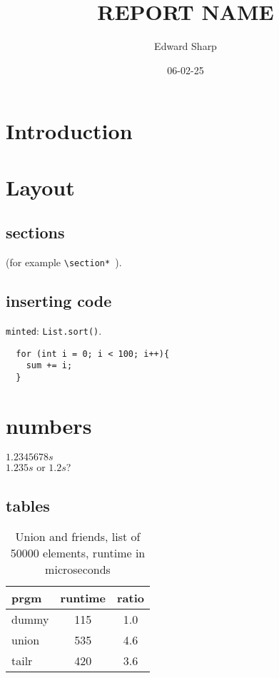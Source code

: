 \documentclass[a4paper,11pt]{article}
\begin{document}
\title{
    \textbf{REPORT NAME}
}
\author{Edward Sharp}
\date{06-02-25}

\maketitle

\section*{Introduction}


\section*{Layout}


\subsection{sections}

{\tt *} (for
example {\tt \textbackslash section* }).

\subsection*{inserting code}

{\tt minted}: {\tt List.sort()}.

\begin{verbatim}
  for (int i = 0; i < 100; i++){
    sum += i;
  }
\end{verbatim}

\section*{numbers}

$1.2345678 s$ \\
$1.235 s$ or $1.2 s$?

\subsection*{tables}

\begin{table}[h]
\begin{center}
\begin{tabular}{l|c|c}
\textbf{prgm} & \textbf{runtime} & \textbf{ratio}\\
\hline
  dummy      &  115 &     1.0\\
  union      &  535 &     4.6\\
  tailr      &  420 &     3.6\\
\end{tabular}
\caption{Union and friends, list of 50000 elements, runtime in microseconds}
\label{tab:table1}
\end{center}
\end{table}
\end{document}
